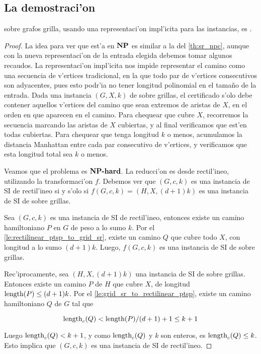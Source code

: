 \subsection{La demostraci'on}

\begin{theorem}
\label{th:sr_grid_npc}
 sobre grafos grilla, usando una representaci'on impl'icita para las instancias, es .
\begin{proof}
La idea para ver que est'a en $\textnormal{\textbf{NP}}$ es similar a la del \autoref{th:sr_npc}, aunque con la nueva representaci'on de la entrada elegida debemos tomar algunos recaudos. La representaci'on impl'icita nos impide representar el camino como una secuencia de v'ertices tradicional, en la que todo par de v'ertices consecutivos son adyacentes, pues esto podr'ia no tener longitud polinomial en el tama\~no de la entrada. Dada una instancia $(G, X, k)$ de  sobre grillas, el certificado s'olo debe contener aquellos v'ertices del camino que sean extremos de aristas de $X$, en el orden en que aparecen en el camino. Para chequear que cubre $X$, recorremos la secuencia marcando las aristas de $X$ cubiertas, y al final verificamos que est'en todas cubiertas. Para chequear que tenga longitud $k$ o menos, acumulamos la distancia Manhattan entre cada par consecutivo de v'ertices, y verificamos que esta longitud total sea $k$ o menos.

Veamos que el problema es $\textnormal{\textbf{NP-hard}}$. La reducci'on es desde  rectil'ineo, utilizando la transformaci'on $f$. Debemos ver que $(G, c, k)$ es una instancia de SI de  rectil'ineo si y s'olo si $f(G, c, k) = (H, X, (d + 1)k)$ es una instancia de SI de  sobre grillas.

Sea $(G, c, k)$ es una instancia de SI de  rectil'ineo, entonces existe un camino hamiltoniano $P$ en $G$ de peso a lo sumo $k$. Por el \autoref{le:rectilinear_ptsp_to_grid_sr}, existe un camino $Q$ que cubre todo $X$, con longitud a lo sumo $(d + 1)k$. Luego, $f(G, c, k)$ es una instancia de SI de  sobre grillas.

Rec'iprocamente, sea $(H, X, (d + 1)k)$ una instancia de SI de  sobre grillas. Entonces existe un camino $P$ de $H$ que cubre $X$, de longitud $\textnormal{length}(P) \leq (d + 1)k$. Por el \autoref{le:grid_sr_to_rectilinear_ptsp}, existe un camino hamiltoniano $Q$ de $G$ tal que

\[\textnormal{length}_c(Q) < \textnormal{length}(P) / (d + 1) + 1 \leq k + 1\]

\noindent
Luego $\textnormal{length}_c(Q) < k + 1$, y como $\textnormal{length}_c(Q)$ y $k$ son enteros, es $\textnormal{length}_c(Q) \leq k$. Esto implica que $(G, c, k)$ es una instancia de SI de  rectil'ineo.
\end{proof}
\end{theorem}

